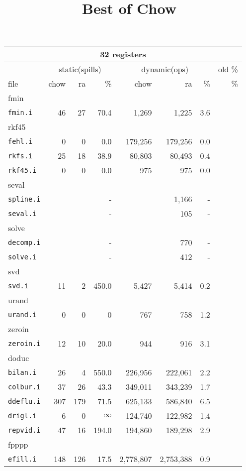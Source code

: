 \documentclass[11pt]{article}
\title{Best of Chow}
\begin{document}
\begin{tabular}{|l|r|r|r|r|r|r|r|}
\hline
\multicolumn{8}{|c|}{32 registers}\\
\hline
&\multicolumn{3}{c}{static(spills)}&\multicolumn{3}{|c|}{dynamic(ops)}&old \%\\
\hline
file&chow&ra&\%&chow&ra&\%&\%\\
\hline
%
%
\multicolumn{8}{|l|}{fmin}\\
\hline
\texttt{fmin.i}&46&27&70.4&1,269&1,225&3.6 \\
\hline
%
%
\multicolumn{8}{|l|}{rkf45}\\
\hline
\texttt{fehl.i}&0&0&0.0&179,256&179,256&0.0 \\
\texttt{rkfs.i}&25&18&38.9&80,803&80,493&0.4 \\
\texttt{rkf45.i}&0&0&0.0&975&975&0.0\\
%
%
\hline
\multicolumn{8}{|l|}{seval}\\
\hline
\texttt{spline.i}&&&-&&1,166&-\\
\texttt{seval.i}&&&-&&105&-\\
%
%
\hline
\multicolumn{8}{|l|}{solve}\\
\hline
\texttt{decomp.i}&&&-&&770&-\\
\texttt{solve.i}&&&-&&412&-\\
\hline
%
%
\multicolumn{8}{|l|}{svd}\\
\hline
\texttt{svd.i}&11&2&450.0&5,427&5,414&0.2 \\
\hline
%
%
\multicolumn{8}{|l|}{urand}\\
\hline
\texttt{urand.i}&0&0&0&767&758&1.2\\
\hline
%
%
\multicolumn{8}{|l|}{zeroin}\\
\hline
\texttt{zeroin.i}&12&10&20.0&944&916&3.1 \\
\hline
%
%
\multicolumn{8}{|l|}{doduc}\\
\hline
\texttt{bilan.i}&26&4&550.0&226,956&222,061&2.2\\
\texttt{colbur.i}&37&26&43.3&349,011&343,239&1.7 \\
\texttt{ddeflu.i}&307&179&71.5&625,133&586,840&6.5 \\
\texttt{drigl.i}&6&0&$\infty$&124,740&122,982&1.4 \\
\texttt{repvid.i}&47&16&194.0&194,860&189,298&2.9 \\
\hline
%
%
\multicolumn{8}{|l|}{fpppp}\\
\hline
\texttt{efill.i}&148&126&17.5&2,778,807&2,753,388&0.9 \\
\hline

\hline
\end{tabular}
\end{document}
